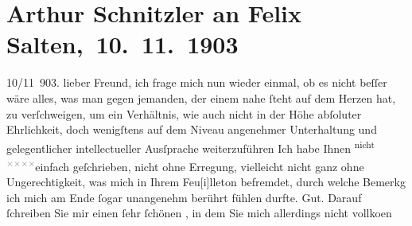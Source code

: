 

         
         \renewcommand{\erwaehntePersonen}{Personen: Felix Salten}
         \renewcommand{\erwaehnteOrte}{Orte: Wien}
         \renewcommand{\erwaehnteWerke}{Werke: Arthur Schnitzler und sein »Reigen«}
               \section[ Arthur Schnitzler an Felix Salten, 10. 11. 1903]{ Arthur Schnitzler an Felix Salten, 10. 11. 1903}\nopagebreak{}\rehead{ }\begin{ledgroupsized}[t]{13cm}\normalsize\beginnumbering \toendnotes[C]{\smallbreak\pagebreak[2]} 
\toendnotes[C]{\smallbreak}\pstart
           \raggedleft{}{\pb}10/11 903.\pend
           \pstart
           lieber Freund, ich frage mich nun wieder einmal, ob es nicht beſſer
               wäre alles, was man gegen jemanden, der einem nahe ſteht auf dem Herzen hat, zu
               verſchweigen, um ein Verhältnis, wie auch nicht in der Höhe abſoluter Ehrlichkeit,
               doch wenigſtens auf dem Niveau angenehmer Unterhaltung {\pb}und gelegentlicher intellectueller Ausſprache
                  weiterzuführen{\dotstwo} Ich habe Ihnen \substVorne{}\textsuperscript{nicht \textcolor{gray}{×}\-\textcolor{gray}{×}\-\textcolor{gray}{×}\-\textcolor{gray}{×}}{\allowbreak}\substDazwischen{}einfach geſchrie\substHinten{}ben, nicht ohne Erregung, vielleicht nicht ganz ohne Ungerechtigkeit, was
               mich in Ihrem Feu{[}i{]}lleton befremdet, durch welche Bemerkg ich mich
               am Ende ſogar unangenehm berührt fühlen durfte. Gut. Darauf ſchreiben Sie mir einen
               ſehr {\pb}ſchönen \label{K_L02989-1v}\label{K_L02989-1h}, in dem Sie mich allerdings nicht vollko{\geminationm}en

\end{ledgroupsized}

